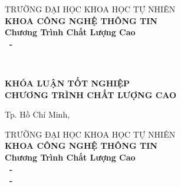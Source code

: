 \pagestyle{empty}
\begin{titlepage}


\begin{center}
TRƯỜNG ĐẠI HỌC KHOA HỌC TỰ NHIÊN\\
\textbf{KHOA CÔNG NGHỆ THÔNG TIN}\\
\textbf{Chương Trình Chất Lượng Cao}\\[2cm]


{ \bfseries \firstStudentUppercase~-~\secondStudentUppercase\\[2cm] } 


{ \Large \bfseries \thesisNameUppercase \\[3cm] }


{ \bfseries KHÓA LUẬN TỐT NGHIỆP\\CHƯƠNG TRÌNH CHẤT LƯỢNG CAO\\[2cm] }


\vfill
Tp. Hồ Chí Minh, \releaseDate

\end{center}

\pagebreak


\begin{center}

TRƯỜNG ĐẠI HỌC KHOA HỌC TỰ NHIÊN\\
\textbf{KHOA CÔNG NGHỆ THÔNG TIN}\\
\textbf{Chương Trình Chất Lượng Cao}\\[2cm]


{ \bfseries \firstStudentUppercase~-~\firstStudentId\\[0.5cm] } %
{ \bfseries \secondStudentUppercase~-~\secondStudentId\\[2cm] }



{ \Large \bfseries \thesisNameUppercase \\[2cm] }



\end{center}
\end{titlepage}
